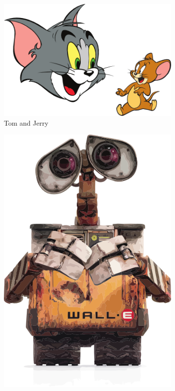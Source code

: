 \begin{landscape}
\begin{figure}
  \centering
  \begin{subfigure}[b]{0.3\textwidth}
    \includegraphics[width=\textwidth]{TomandJerry}
    \caption{Tom and Jerry}
    \label{fig:TomJerry}   
  \end{subfigure}             
  \begin{subfigure}[b]{0.3\textwidth}
    \includegraphics[width=\textwidth]{WallE}

\end{subfigure}
\end{figure}
\end{landscape}
